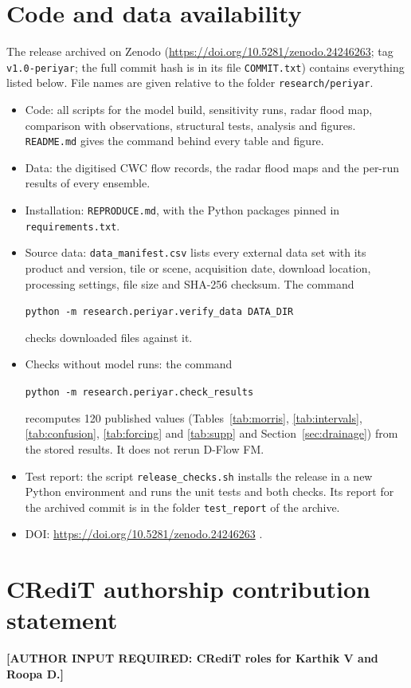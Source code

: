 \documentclass[preprint,12pt,authoryear]{elsarticle}
\begin{document}
\section*{Code and data availability}
{\sloppy
The release archived on Zenodo (\url{https://doi.org/10.5281/zenodo.24246263}; tag \texttt{v1.0-periyar}; the full commit hash is in its file \texttt{COMMIT.txt}) contains everything listed below. File names are given relative to the folder \texttt{research/periyar}.
\begin{itemize}
\item Code: all scripts for the model build, sensitivity runs, radar flood map, comparison with observations, structural tests, analysis and figures. \texttt{README.md} gives the command behind every table and figure.
\item Data: the digitised CWC flow records, the radar flood maps and the per-run results of every ensemble.
\item Installation: \texttt{REPRODUCE.md}, with the Python packages pinned in \texttt{requirements.txt}.
\item Source data: \texttt{data\_manifest.csv} lists every external data set with its product and version, tile or scene, acquisition date, download location, processing settings, file size and SHA-256 checksum. The command
\begin{center}\texttt{python -m research.periyar.verify\_data DATA\_DIR}\end{center}
checks downloaded files against it.
\item Checks without model runs: the command
\begin{center}\texttt{python -m research.periyar.check\_results}\end{center}
recomputes 120 published values (Tables~\ref{tab:morris}, \ref{tab:intervals}, \ref{tab:confusion}, \ref{tab:forcing} and \ref{tab:supp} and Section~\ref{sec:drainage}) from the stored results. It does not rerun D-Flow FM.
\item Test report: the script \texttt{release\_checks.sh} installs the release in a new Python environment and runs the unit tests and both checks. Its report for the archived commit is in the folder \texttt{test\_report} of the archive.
\item DOI: \url{https://doi.org/10.5281/zenodo.24246263} \citep{karthik2026zenodo}.
\end{itemize}
\par}

\section*{CRediT authorship contribution statement}
\textbf{[AUTHOR INPUT REQUIRED: CRediT roles for Karthik V and Roopa D.]}
\end{document}
